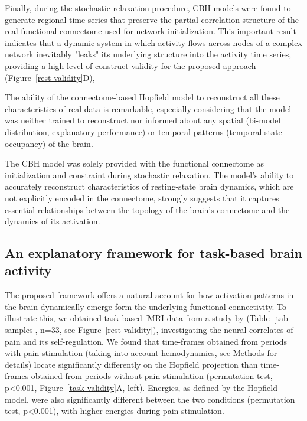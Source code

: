 \documentclass{article}
\begin{document}
Finally, during the stochastic relaxation procedure, CBH models were found to generate regional time series that preserve the partial correlation structure of the real functional connectome used for network initialization.
This important result indicates that a dynamic system in which activity flows across nodes of a complex network inevitably "leaks" its underlying structure into the activity time series, providing a high level of construct validity for the proposed approach (Figure~\ref{rest-validity}D),

The ability of the connectome-based Hopfield model to reconstruct all these characteristics of real data is remarkable, especially considering that the model was neither trained to reconstruct nor informed about any spatial (bi-model distribution, explanatory performance) or temporal patterns (temporal state occupancy) of the brain.

The CBH model was solely provided with the functional connectome as initialization and constraint during stochastic relaxation. The model's ability to accurately reconstruct characteristics of resting-state brain dynamics, which are not explicitly encoded in the connectome, strongly suggests that it captures essential relationships between the topology of the brain's connectome and the dynamics of its activation.

\subsection{An explanatory framework for task-based brain activity}\label{An explanatory framework for task-based brain activity}

The proposed framework offers a natural account for how activation patterns in the brain dynamically emerge form the underlying functional connectivity. To illustrate this, we obtained task-based fMRI data from a study by \href{https://doi.org/10.1371/journal.pbio.1002036}{} (Table~\ref{tab-samples}, n=33, see Figure~\ref{rest-validity}), investigating the neural correlates of pain and its self-regulation.
We found that time-frames obtained from periods with pain stimulation (taking into account hemodynamics, see Methods for details) locate significantly differently on the Hopfield projection than time-frames obtained from periods without pain stimulation (permutation test, p\textless 0.001, Figure~\ref{task-validity}A, left).
Energies, as defined by the Hopfield model, were also significantly different between the two conditions (permutation test, p\textless 0.001), with higher energies during pain stimulation.
\end{document}
